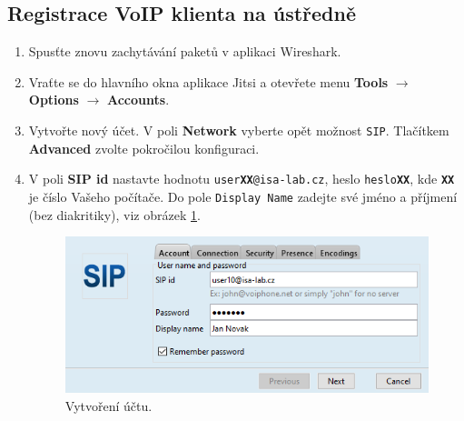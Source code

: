 \subsection{Registrace VoIP klienta na ústředně}
\begin{enumerate}
    \item Spusťte znovu zachytávání paketů v aplikaci Wireshark.
    \item Vraťte se do hlavního okna aplikace Jitsi a otevřete menu {\bf Tools} $\rightarrow$ {\bf Options} $\rightarrow$ {\bf Accounts}.
    \item Vytvořte nový účet. V poli {\bf Network} vyberte opět možnost {\tt SIP}. Tlačítkem {\bf Advanced} zvolte pokročilou konfiguraci.
    \item V poli {\bf SIP id} nastavte hodnotu {\tt user{\bf XX}@isa-lab.cz}, heslo {\tt heslo{\bf XX}}, kde {\tt\bf XX} je číslo Vašeho počítače. Do pole {\tt Display Name} zadejte své jméno a příjmení (bez diakritiky), viz obrázek \ref{fig:registration1}.
      \begin{figure}[h!]
        \centering
        \includegraphics[scale=0.7]{img/jitsi-registration1c.png}
        \caption{Vytvoření účtu.}
        \label{fig:registration1}
      \end{figure}
      

\end{enumerate}
